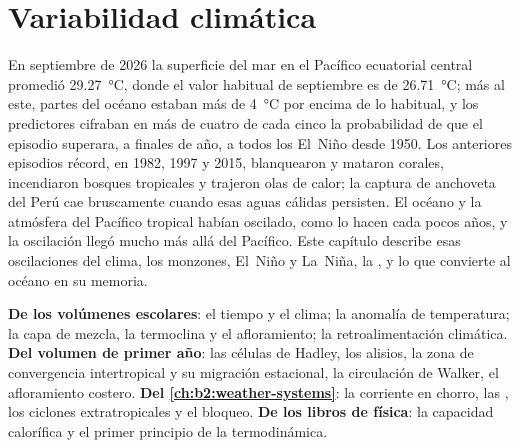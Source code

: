 \chapter{Variabilidad climática}\label{ch:b2:climate-variability}

En septiembre de 2026 la superficie del mar en el Pacífico ecuatorial central promedió \qty{29.27}{\celsius},
donde el valor habitual de septiembre es de \qty{26.71}{\celsius}; más al este, partes del océano estaban
más de \qty{4}{\celsius} por encima de lo habitual, y los predictores cifraban en más de cuatro de cada cinco la
probabilidad de que el episodio superara, a finales de año, a todos los El~Niño desde 1950. Los anteriores
episodios récord, en 1982, 1997 y 2015, blanquearon y mataron corales, incendiaron bosques tropicales
y trajeron olas de calor; la captura de anchoveta del Perú cae bruscamente cuando esas aguas cálidas persisten. El
océano y la atmósfera del Pacífico tropical habían oscilado, como lo hacen cada pocos años, y la
oscilación llegó mucho más allá del Pacífico. Este
capítulo describe esas oscilaciones del clima, los monzones, El~Niño y La~Niña, la , y lo que convierte al océano en su memoria.

\begin{recall}
\textbf{De los volúmenes escolares}: el tiempo y el clima; la anomalía de temperatura; la capa de mezcla,
la termoclina y el afloramiento; la retroalimentación climática. \textbf{Del volumen de primer año}: las células de
Hadley, los alisios, la zona de convergencia intertropical y su migración estacional, la circulación
de Walker, el afloramiento costero. \textbf{Del \cref{ch:b2:weather-systems}}: la corriente en chorro,
las , los ciclones extratropicales y el bloqueo. \textbf{De los libros de física}: la capacidad calorífica
y el primer principio de la termodinámica.
\end{recall}

